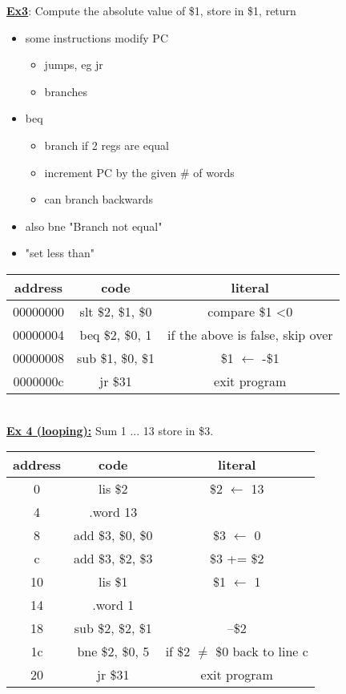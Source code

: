 \documentclass[12pt]{article}
\newcommand{\myt}[1]{\textbf{\underline{#1}}}
\begin{document}
	\myt{Ex3}: Compute the absolute value of \$1, store in \$1, return\\
	\begin{itemize}
		\item some instructions modify PC
		\begin{itemize}
			\item jumps, eg jr
			\item branches
		\end{itemize}
		\item beq
		\begin{itemize}
			\item branch if 2 regs are equal
			\item increment PC by the given \# of words
			\item can branch backwards
		\end{itemize}
		\item also bne "Branch not equal"
		\item "set less than"
	\end{itemize}
	
	\begin{tabular}{c| c | c}
		address & code & literal \\ \hline
		00000000 & slt \$2, \$1, \$0 & compare \$1 \textless 0 \\
		00000004 & beq \$2, \$0, 1 & if the above is false, skip over \\
		00000008 & sub \$1, \$0, \$1 & \$1 $\leftarrow$ -\$1 \\
		0000000c & jr \$31 & exit program
	\end{tabular}
	\newline  \\
	
	\myt{Ex 4 (looping):} Sum 1 ... 13 store in \$3.\\
	
	\begin{tabular}{c | c | c}
		address & code & literal \\ \hline
		0 & lis \$2 & \$2 $\leftarrow$ 13 \\
		4 & .word 13 & \\
		8 & add \$3, \$0, \$0 & \$3 $\leftarrow$ 0 \\
		c & add \$3, \$2, \$3 & \$3 += \$2 \\
		10 & lis \$1 & \$1 $\leftarrow$ 1 \\
		14 & .word 1 & \\
		18 & sub \$2, \$2, \$1 & --\$2 \\
		1c & bne \$2, \$0, 5 & if \$2 $\neq$ \$0 back to line c \\
		20 & jr \$31 & exit program \\
	\end{tabular}
	
\end{document}
